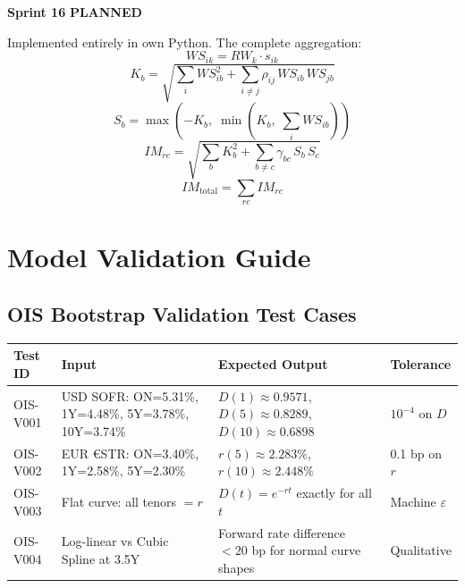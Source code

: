\documentclass[11pt, a4paper]{article}
\newcommand{\sprintstatus}[3]{%
  \begin{tcolorbox}[sprintbox]
  \small
  \textbf{\color{navy}Sprint #1} \quad
  \textbf{\color{#2}#3}
  \end{tcolorbox}\vspace{4pt}
}
\begin{document}
\sprintstatus{16}{amber!80!black}{PLANNED}

Implemented entirely in own Python. The complete aggregation:
\begin{equation}
  WS_{ik} = RW_k\cdot s_{ik}
\end{equation}
\begin{equation}
  K_b = \sqrt{\sum_i WS_{ib}^2 + \sum_{i\neq j}\rho_{ij}\,WS_{ib}\,WS_{jb}}
\end{equation}
\begin{equation}
  S_b = \max\!\left(-K_b,\;\min\!\left(K_b,\;\sum_i WS_{ib}\right)\right)
\end{equation}
\begin{equation}
  IM_{rc} = \sqrt{\sum_b K_b^2 + \sum_{b\neq c}\gamma_{bc}\,S_b\,S_c}
\end{equation}
\begin{equation}
  IM_{\mathrm{total}} = \sum_{rc} IM_{rc}
\end{equation}

\section{Model Validation Guide}

\subsection{OIS Bootstrap Validation Test Cases}

\begin{center}
\begin{tabular}{L{1.5cm} L{4.5cm} L{4cm} L{2.5cm}}
\toprule
\textbf{Test ID} & \textbf{Input} & \textbf{Expected Output} & \textbf{Tolerance} \\
\midrule
OIS-V001
& USD SOFR: ON=5.31\%, 1Y=4.48\%, 5Y=3.78\%, 10Y=3.74\%
& $D(1) \approx 0.9571$, $D(5) \approx 0.8289$, $D(10) \approx 0.6898$
& $10^{-4}$ on $D$ \\
\addlinespace
OIS-V002
& EUR €STR: ON=3.40\%, 1Y=2.58\%, 5Y=2.30\%
& $r(5) \approx 2.283\%$, $r(10) \approx 2.448\%$
& 0.1 bp on $r$ \\
\addlinespace
OIS-V003
& Flat curve: all tenors $= r$
& $D(t) = e^{-rt}$ exactly for all $t$
& Machine $\varepsilon$ \\
\addlinespace
OIS-V004
& Log-linear vs Cubic Spline at 3.5Y
& Forward rate difference $< 20$ bp for normal curve shapes
& Qualitative \\
\bottomrule
\end{tabular}
\end{center}
\end{document}
